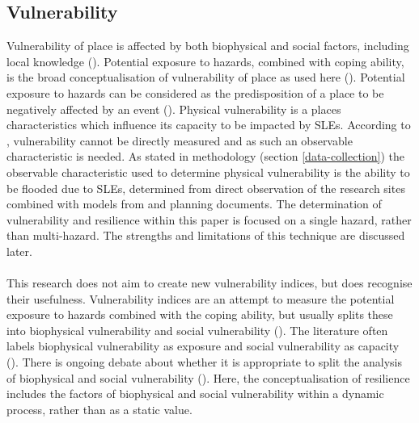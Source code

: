 \subsection{Vulnerability}
Vulnerability of place is affected by both biophysical and social factors, including local knowledge (\cite{opach_seeking_2020}). Potential exposure to hazards, combined with coping ability, is the broad conceptualisation of vulnerability of place as used here (\cite{rygel_method_2006}). Potential exposure to hazards can be considered as the predisposition of a place to be negatively affected by an event (\cite{lujala_quantifying_2014}). Physical vulnerability is a places characteristics which influence its capacity to be impacted by SLEs. According to \cite{rod_integrated_2012}, vulnerability cannot be directly measured and as such an observable characteristic is needed.  As stated in methodology (section \ref{data-collection}) the observable characteristic used to determine physical vulnerability is the ability to be flooded due to SLEs, determined from direct observation of the research sites combined with models from \cite{kartverket_se_2020} and planning documents. The determination of vulnerability and resilience within this paper is focused on a single hazard, rather than multi-hazard. The strengths and limitations of this technique are discussed later. 
\paragraph{}
This research does not aim to create new vulnerability indices, but does recognise their usefulness. Vulnerability indices are an attempt to measure the potential exposure to hazards combined with the coping ability, but usually splits these into biophysical vulnerability  and social vulnerability (\cite{rod_integrated_2012}). The literature often labels biophysical vulnerability as exposure and social vulnerability as capacity (\cite{rod_integrated_2012}). There is ongoing debate about whether it is appropriate to split the analysis of biophysical and social vulnerability (\cite{lujala_quantifying_2014}). Here, the conceptualisation of resilience includes the factors of biophysical and social vulnerability within a dynamic process, rather than as a static value.

